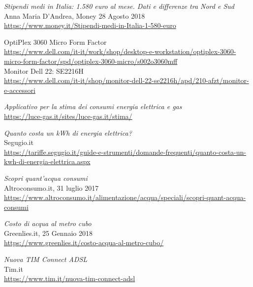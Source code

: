 \begin{thebibliography}{99}
\emph{Stipendi medi in Italia: 1.580 euro al mese. Dati e differenze tra Nord e
Sud} \\
Anna Maria D’Andrea, Money 28 Agosto 2018 \\
\url{https://www.money.it/Stipendi-medi-in-Italia-1-580-euro}

OptiPlex 3060 Micro Form Factor\\
\url{https://www.dell.com/it-it/work/shop/desktop-e-workstation/optiplex-3060-micro-form-factor/spd/optiplex-3060-micro/s002o3060mff}
\\
Monitor Dell 22: SE2216H \\
\url{https://www.dell.com/it-it/shop/monitor-dell-22-se2216h/apd/210-afzt/monitor-e-accessori}

\emph{Applicativo per la stima dei consumi energia elettrica e gas}\\
\url{https://luce-gas.it/sites/luce-gas.it/stima/}

\emph{Quanto costa un kWh di energia elettrica?}\\
Segugio.it\\
\url{https://tariffe.segugio.it/guide-e-strumenti/domande-frequenti/quanto-costa-un-kwh-di-energia-elettrica.aspx}

\emph{Scopri quant'acqua consumi}\\
Altroconsumo.it, 31 luglio 2017 \\
\url{https://www.altroconsumo.it/alimentazione/acqua/speciali/scopri-quant-acqua-consumi}

\emph{Costo di acqua al metro cubo} \\
Greenlies.it, 25 Gennaio 2018 \\
\url{https://www.greenlies.it/costo-acqua-al-metro-cubo/}

\emph{Nuova TIM Connect ADSL} \\
Tim.it \\
\url{https://www.tim.it/nuova-tim-connect-adsl}



\end{thebibliography}
